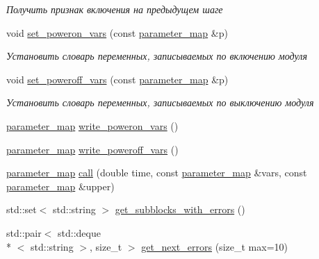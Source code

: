 \begin{DoxyCompactItemize}
\begin{DoxyCompactList}\small\item\em Получить признак включения на предыдущем шаге \end{DoxyCompactList}\item 
void \hyperlink{classLIBKMS__namespace_1_1Block_ade9aea609aecf6bfc8664003e5f0d33c}{set\-\_\-poweron\-\_\-vars} (const \hyperlink{classLIBKMS__namespace_1_1Block_a8d67012b101494c21dee73cd82a1e99f}{parameter\-\_\-map} \&p)
\begin{DoxyCompactList}\small\item\em Установить словарь переменных, записываемых по включению модуля \end{DoxyCompactList}\item 
void \hyperlink{classLIBKMS__namespace_1_1Block_a1976ce5bedc5c014cc7444a53009d5a9}{set\-\_\-poweroff\-\_\-vars} (const \hyperlink{classLIBKMS__namespace_1_1Block_a8d67012b101494c21dee73cd82a1e99f}{parameter\-\_\-map} \&p)
\begin{DoxyCompactList}\small\item\em Установить словарь переменных, записываемых по выключению модуля \end{DoxyCompactList}\item 
\hyperlink{classLIBKMS__namespace_1_1Block_a8d67012b101494c21dee73cd82a1e99f}{parameter\-\_\-map} \hyperlink{classLIBKMS__namespace_1_1Block_a2dbcc05db46fa70b284bb4e3fd0e6ae4}{write\-\_\-poweron\-\_\-vars} ()
\item 
\hyperlink{classLIBKMS__namespace_1_1Block_a8d67012b101494c21dee73cd82a1e99f}{parameter\-\_\-map} \hyperlink{classLIBKMS__namespace_1_1Block_a9576f7464cb1111775fa2f07c2c30937}{write\-\_\-poweroff\-\_\-vars} ()
\item 
\hyperlink{classLIBKMS__namespace_1_1Block_a8d67012b101494c21dee73cd82a1e99f}{parameter\-\_\-map} \hyperlink{classLIBKMS__namespace_1_1Block_a526864a3f11d6bbfdd2c5df34386c19d}{call} (double time, const \hyperlink{classLIBKMS__namespace_1_1Block_a8d67012b101494c21dee73cd82a1e99f}{parameter\-\_\-map} \&vars, const \hyperlink{classLIBKMS__namespace_1_1Block_a8d67012b101494c21dee73cd82a1e99f}{parameter\-\_\-map} \&upper)
\item 
std\-::set$<$ std\-::string $>$ \hyperlink{classLIBKMS__namespace_1_1Block_a0977650092787638c559ea40fff04d64}{get\-\_\-subblocks\-\_\-with\-\_\-errors} ()
\item 
std\-::pair$<$ std\-::deque\\*
$<$ std\-::string $>$, size\-\_\-t $>$ \hyperlink{classLIBKMS__namespace_1_1Block_af2ed32615fbeb3e4671d4d4b35802f45}{get\-\_\-next\-\_\-errors} (size\-\_\-t max=10)
\end{DoxyCompactItemize}
